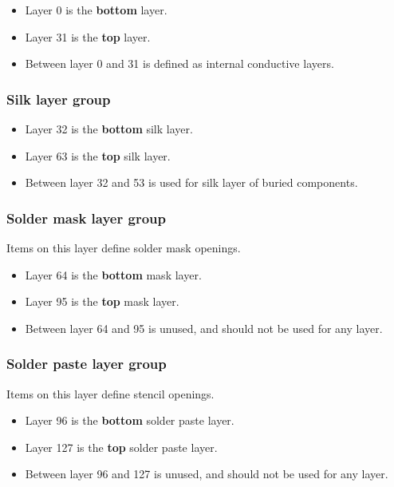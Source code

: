 \documentclass[12pt]{article}
\begin{document}
\begin{itemize}
\item
  Layer 0 is the \textbf{bottom} layer.
\item
  Layer 31 is the \textbf{top} layer.
\item
  Between layer 0 and 31 is defined as internal conductive layers.
\end{itemize}

\subsubsection{Silk layer group}\label{silk-layer-group}

\begin{itemize}
\item
  Layer 32 is the \textbf{bottom} silk layer.
\item
  Layer 63 is the \textbf{top} silk layer.
\item
  Between layer 32 and 53 is used for silk layer of buried components.
\end{itemize}

\subsubsection{Solder mask layer group}\label{mask-layer-group}

Items on this layer define solder mask openings.

\begin{itemize}
\itemsep1pt\parskip0pt
\item
  Layer 64 is the \textbf{bottom} mask layer.
\item
  Layer 95 is the \textbf{top} mask layer.
\item
  Between layer 64 and 95 is unused, and should not be used for any
  layer.
\end{itemize}

\subsubsection{Solder paste layer group}\label{mask-layer-group}

Items on this layer define stencil openings.

\begin{itemize}
\itemsep1pt\parskip0pt
\item
  Layer 96 is the \textbf{bottom} solder paste layer.
\item
  Layer 127 is the \textbf{top} solder paste layer.
\item
  Between layer 96 and 127 is unused, and should not be used for any
  layer.
\end{itemize}
\end{document}
